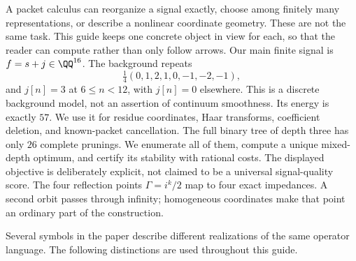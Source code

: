 A packet calculus can reorganize a signal exactly, choose among finitely many representations, or describe a nonlinear coordinate geometry. These are not the same task. This guide keeps one concrete object in view for each, so that the reader can compute rather than only follow arrows.
Our main finite signal is $f=s+j\in\QQ^{16}$. The background repeats
\[
\tfrac14(0,1,2,1,0,-1,-2,-1),
\]
and $j[n]=3$ at $6\le n<12$, with $j[n]=0$ elsewhere. This is a discrete background model, not an assertion of continuum smoothness. Its energy is exactly $57$. We use it for residue coordinates, Haar transforms, coefficient deletion, and known-packet cancellation.
The full binary tree of depth three has only $26$ complete prunings. We enumerate all of them, compute a unique mixed-depth optimum, and certify its stability with rational costs. The displayed objective is deliberately explicit, not claimed to be a universal signal-quality score.
The four reflection points $\Gamma=i^k/2$ map to four exact impedances. A second orbit passes through infinity; homogeneous coordinates make that point an ordinary part of the construction.

Several symbols in the paper describe different realizations of the same operator language. The following distinctions are used throughout this guide.

